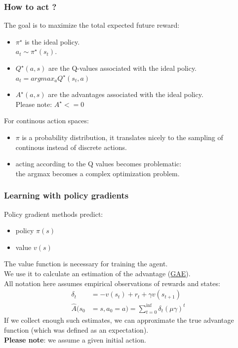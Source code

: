 \documentclass{beamer}
\begin{document}
\begin{frame}
\frametitle{How to act ?}
The goal is to maximize the total expected future reward:
\begin{itemize}
\item \(\pi^\star\) is the ideal policy. \\
\hspace{0.3cm} \textrightarrow  \hspace{0.3cm} \(a_t \sim \pi^\star(s_t)\). 
\item \(Q^\star(a, s)\) are the Q-values associated with the ideal policy.\\
\hspace{0.3cm} \textrightarrow  \hspace{0.3cm} \(a_t = argmax_a Q^\star(s_t, a)\)
\item \(A^\star(a, s)\) are the advantages associated with the ideal policy. \\
Please note: \(A^\star <= 0\)
\end{itemize}
\bigskip

For continous action spaces:
\begin{itemize}
\item \(\pi\) is a probability distribution, it translates nicely to the sampling of continous instead of discrete actions.
\item acting according to the Q values becomes problematic:\\
\hspace{0.3cm} \textrightarrow  \hspace{0.3cm} the argmax becomes a complex optimization problem.
\end{itemize}
\end{frame}

\begin{frame}
\frametitle{Learning with policy gradients}
Policy gradient methods predict:
\begin{itemize}
\item policy \(\pi(s)\)
\item value \(v(s)\)
\end{itemize}
The value function is necessary for training the agent. \\
We use it to calculate an estimation of the advantage (\href{https://arxiv.org/abs/1506.02438}{GAE}). \\
All notation here assumes empirical observations of rewards and states:
\begin{align*}
\delta_t &= -v(s_t) + r_t + \gamma  v(s_{t+1}) \\
\hat{A}(s_0 &=s, a_0 =a) = \sum_{t=0}^{\inf} \delta_t (\mu \gamma) ^t
\end{align*}
If we collect enough such estimates, we can approximate the true advantage function (which was defined as an expectation).\\
\textbf{Please note}: we assume a given initial action.
\end{frame}
\end{document}
